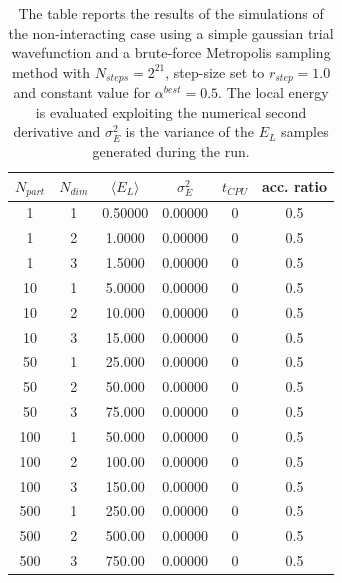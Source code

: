 \begin{table}[H]
    \centering
    \begin{tabular}{cccccc}
    $N_{part}$ & $N_{dim}$ & $\langle E_L \rangle $ & $\sigma^2_E$ & $t_{CPU}$ & acc. ratio \\
    \midrule
    1 & 1 & 0.50000 & 0.00000 & 0 & 0.5 \\
    1 & 2 & 1.0000 & 0.00000 & 0 & 0.5 \\
    1 & 3 & 1.5000 & 0.00000 & 0 & 0.5 \\
    \midrule
    10 & 1 & 5.0000 & 0.00000 & 0 & 0.5 \\
    10 & 2 & 10.000 & 0.00000 & 0 & 0.5 \\
    10 & 3 & 15.000 & 0.00000 & 0 & 0.5 \\
    \midrule
    50 & 1 & 25.000 & 0.00000 & 0 & 0.5 \\
    50 & 2 & 50.000 & 0.00000 & 0 & 0.5 \\
    50 & 3 & 75.000 & 0.00000 & 0 & 0.5 \\
    \midrule
    100 & 1 & 50.000 & 0.00000 & 0 & 0.5 \\
    100 & 2 & 100.00 & 0.00000 & 0 & 0.5 \\
    100 & 3 & 150.00 & 0.00000 & 0 & 0.5 \\
    \midrule
    500 & 1 & 250.00 & 0.00000 & 0 & 0.5 \\
    500 & 2 & 500.00 & 0.00000 & 0 & 0.5 \\
    500 & 3 & 750.00 & 0.00000 & 0 & 0.5 \\
    \bottomrule
    \end{tabular}
    \caption{The table reports the results of the simulations of the non-interacting case using a simple gaussian trial wavefunction and a brute-force Metropolis sampling method with $N_{steps}=2^{21}$, step-size set to $r_{step}=1.0$ and constant value for $\alpha^{best}=0.5$. The local energy is evaluated exploiting the numerical second derivative and $\sigma_E^2$ is the variance of the $E_L$ samples generated during the run. }
    \label{tab:tab_x_metropolis_numerical}
\end{table}

